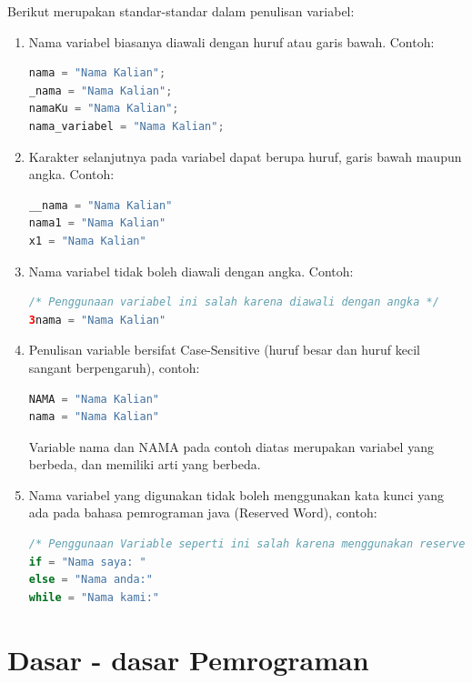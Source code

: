 Berikut merupakan standar-standar dalam penulisan variabel:
\begin{enumerate}
\item Nama variabel biasanya diawali dengan huruf atau garis bawah. Contoh:
\begin{lstlisting}[language=Java]
nama = "Nama Kalian";
_nama = "Nama Kalian";
namaKu = "Nama Kalian";
nama_variabel = "Nama Kalian";
\end{lstlisting}

\item Karakter selanjutnya pada variabel dapat berupa huruf, garis bawah maupun angka. Contoh:
\begin{lstlisting}[language=Java]
__nama = "Nama Kalian"
nama1 = "Nama Kalian"
x1 = "Nama Kalian"    
\end{lstlisting}

\item  Nama variabel tidak boleh diawali dengan angka. Contoh:
\begin{lstlisting}[language=Java]
/* Penggunaan variabel ini salah karena diawali dengan angka */
3nama = "Nama Kalian"    
\end{lstlisting}

\item Penulisan variable bersifat Case-Sensitive (huruf besar dan huruf kecil sangant berpengaruh), contoh: 
\begin{lstlisting}[language=Java]
NAMA = "Nama Kalian"
nama = "Nama Kalian"
\end{lstlisting}
Variable nama dan NAMA pada contoh diatas merupakan variabel yang berbeda, dan memiliki arti yang berbeda.

\item Nama variabel yang digunakan tidak boleh menggunakan kata kunci yang ada pada bahasa pemrograman java (Reserved Word), contoh: 
\begin{lstlisting}[language=Java]
/* Penggunaan Variable seperti ini salah karena menggunakan reserved word pada java. */
if = "Nama saya: "
else = "Nama anda:"
while = "Nama kami:"    
\end{lstlisting}
\end{enumerate}


\section{Dasar - dasar Pemrograman}
